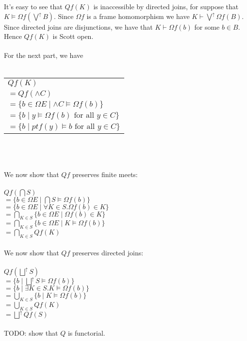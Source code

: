 \documentclass{article}
\begin{document}
It's easy to see that $Qf(K)$ is inaccessible by directed joins, for suppose that $K \vDash \Omega f(\bigvee^{\uparrow} B)$. Since $\Omega f$ 
is a frame homomorphism we have $K \vdash \bigvee^{\uparrow} \Omega f(B)$. Since directed joins are disjunctions, we have that 
$K \vdash \Omega f(b)$ for some $b \in B$. Hence $Qf(K)$ is Scott open.\\~\\
For the next part, we have \\~\\
\begin{tabular}{l}
$Qf(K)$  \\
$= Qf( \wedge C )$ \\
$= \{ b \in \Omega E \mid \wedge C \vDash \Omega f(b) \}$ \\
$= \{ b \mid y \vDash \Omega f(b) \text{ for all } y \in C \}$ \\
$= \{ b \mid \mathit{pt} f(y) \vDash b \text{ for all } y \in C \}$  
\end{tabular}\\~\\~\\
We now show that $Qf$ preserves finite meets:~\\~\\
$Qf( \bigcap S )$\\
$= \{ b \in \Omega E \mid \bigcap S \vDash \Omega f(b) \}$ \\
$= \{ b \in \Omega E \mid \forall K \in S. \Omega f(b) \in K \}$\\
$= \bigcap_{K \in S} \{ b \in \Omega E \mid \Omega f(b) \in K \}$\\
$= \bigcap_{K \in S} \{ b \in \Omega E \mid K \vDash \Omega f(b) \}$\\
$= \bigcap_{K \in S} Qf(K)$\\~\\
We now show that $Qf$ preserves directed joins:~\\~\\
$Qf(\bigsqcup^{\uparrow} S)$\\
$= \{ b \mid \bigsqcup^{\uparrow} S \vDash \Omega f(b) \}$\\
$= \{ b \mid \exists K \in S. K \vDash \Omega f (b) \}$\\
$= \bigcup_{K \in S} \{ b \mid K \vDash \Omega f(b) \}$\\
$= \bigcup_{K \in S} Qf(K)$\\
$= \bigsqcup^{\uparrow} Qf(S)$\\~\\
TODO: show that $Q$ is functorial.
\end{document}
